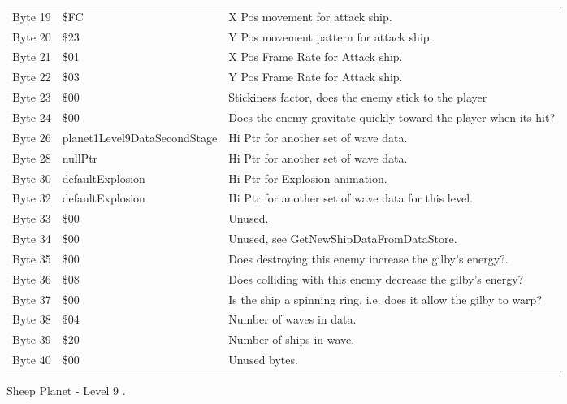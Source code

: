\begin{figure}[H]
{\begin{adjustbox}{width=12cm}
\begin{tabular}{lll}
 Byte 19 & \$FC                          & X Pos movement for attack ship.                                    \\
 Byte 20 & \$23                          & Y Pos movement pattern for attack ship.                            \\
 Byte 21 & \$01                          & X Pos Frame Rate for Attack ship.                                  \\
 Byte 22 & \$03                          & Y Pos Frame Rate for Attack ship.                                  \\
 Byte 23 & \$00                          & Stickiness factor, does the enemy stick to the player              \\
 Byte 24 & \$00                          & Does the enemy gravitate quickly toward the player when its hit?   \\
 Byte 26 & planet1Level9DataSecondStage & Hi Ptr for another set of wave data.                               \\
 Byte 28 & nullPtr                      & Hi Ptr for another set of wave data.                               \\
 Byte 30 & defaultExplosion             & Hi Ptr for Explosion animation.                                    \\
 Byte 32 & defaultExplosion             & Hi Ptr for another set of wave data for this level.                \\
 Byte 33 & \$00                          & Unused.                                                            \\
 Byte 34 & \$00                          & Unused, see GetNewShipDataFromDataStore.                           \\
 Byte 35 & \$00                          & Does destroying this enemy increase the gilby's energy?.           \\
 Byte 36 & \$08                          & Does colliding with this enemy decrease the gilby's energy?        \\
 Byte 37 & \$00                          & Is the ship a spinning ring, i.e. does it allow the gilby to warp? \\
 Byte 38 & \$04                          & Number of waves in data.                                           \\
 Byte 39 & \$20                          & Number of ships in wave.                                           \\
 Byte 40 & \$00                          & Unused bytes.                                                      \\
\bottomrule
\end{tabular}

  \end{adjustbox}

  }\caption*{Sheep Planet - Level 9
.}
\end{figure}

